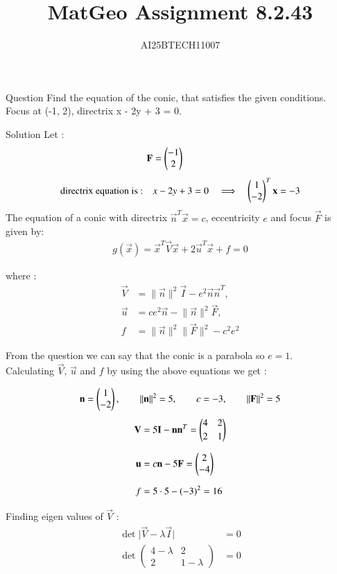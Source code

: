 \documentclass{beamer}
\title 
{MatGeo Assignment 8.2.43}
\author
{AI25BTECH11007}
\begin{document}
\frame{\titlepage}
\begin{frame}{Question}
Find the equation of the conic, that satisfies the given conditions. \\ 
Focus at (-1, 2), directrix x - 2y + 3 =  0. 
\end{frame}

\begin{frame}{Solution}
    Let :
\begin{align}
    \mathbf{F} &= \begin{pmatrix}-1\\2\end{pmatrix}\\[4pt]
    \text{directrix equation is :} \quad &x - 2y + 3 = 0 
    \quad\Longrightarrow\quad \begin{pmatrix}1\\-2\end{pmatrix}^{T}\mathbf{x} = -3
\end{align}
The equation of a conic with directrix $\vec{n}^{T}\vec{x} = c$, eccentricity $e$ and focus $\vec{F}$ is given by:
\begin{align}
    g(\vec{x}) = \vec{x}^{T}\vec{V}\vec{x} + 2\vec{u}^{T}\vec{x} + f  = 0
\end{align}

where :
\begin{align*}
\vec{V} &= \lVert \vec{n} \rVert^{2}\vec{I} - e^{2}\vec{n}\vec{n}^{T} , \\
\vec{u} &= ce^{2}\vec{n} - \lVert \vec{n} \rVert^{2}\vec{F} , \\
f &= \lVert \vec{n} \rVert^{2}\lVert \vec{F} \rVert^{2} - c^{2}e^{2}
\end{align*}
\end{frame}

\begin{frame}
    From the question we can say that the conic is a parabola so $e = 1$.\\
Calculating $\vec{V}$, $\vec{u}$ and $f$ by using the above equations we get :

\[
\mathbf{n}=\begin{pmatrix}1\\-2\end{pmatrix},\qquad \|\mathbf{n}\|^2=5,\qquad c=-3,\qquad \|\mathbf{F}\|^2=5
\]
\begin{align}
   \mathbf{V} &= 5\mathbf{I} - \mathbf{n}\mathbf{n}^T
   = \begin{pmatrix}4 & 2\\[2pt] 2 & 1\end{pmatrix}\\[6pt]
   \mathbf{u} &= c\mathbf{n} - 5\mathbf{F}
   = \begin{pmatrix}2\\-4\end{pmatrix}\\[6pt]  
   f &= 5\cdot 5 - (-3)^2 = 16
\end{align}

Finding eigen values of $\vec{V}$ :
\begin{align}
    \det\lvert \vec{V} - \lambda\vec{I} \rvert &= 0\\[4pt]
    \det\begin{pmatrix} 4 - \lambda & 2 \\[2pt] 2 & 1 - \lambda \end{pmatrix} &= 0\\[4pt] 
\end{align}
\end{frame}
\end{document}
